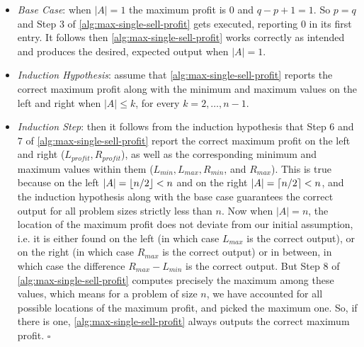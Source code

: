 \documentclass{article}
\begin{document}
\begin{enumerate}[leftmargin={*}, font={\bf}, label={\arabic*.}, ref={\arabic*}]
\begin{enumerate}
        \begin{itemize}[itemsep=0pt]
          \item
            {\it Base Case}: when $|A| = 1$ the maximum profit is $0$ and $q - p + 1 = 1$. So $p =
            q$ and Step $3$ of \autoref{alg:max-single-sell-profit} gets executed, reporting $0$ in
            its first entry. It follows then \autoref{alg:max-single-sell-profit} works correctly
            as intended and produces the desired, expected output when $|A| = 1$.

          \item
            {\it Induction Hypothesis}: assume that \autoref{alg:max-single-sell-profit} reports
            the correct maximum profit along with the minimum and maximum values on the left and
            right when $|A| \leq k$, for every $k = 2, \ldots, n-1$.

          \item
            {\it Induction Step}: then it follows from the induction hypothesis that Step $6$ and
            $7$ of \autoref{alg:max-single-sell-profit} report the correct maximum profit on the
            left and right ($L_{profit}, R_{profit}$), as well as the corresponding minimum and
            maximum values within them ($L_{min}, L_{max}, R_{min}$, and $R_{max}$). This is true
            because on the left $|A| = \lfloor n/2\rfloor < n$ and on the right $|A| = \lceil n/2\rceil < n$,
            and the induction hypothesis along with the base case guarantees the correct output
            for all problem sizes strictly less than $n$. Now when $|A| = n$, the location of the
            maximum profit does not deviate from our initial assumption, i.e. it is either found
            on the left (in which case $L_{max}$ is the correct output), or on the right (in which
            case $R_{max}$ is the correct output) or in between, in which case the difference
            $R_{max} - L_{min}$ is the correct output. But Step $8$ of
            \autoref{alg:max-single-sell-profit} computes precisely the maximum among these values,
            which means for a problem of size $n$, we have accounted for all possible locations of
            the maximum profit, and picked the maximum one. So, if there is one, 
            \autoref{alg:max-single-sell-profit} always outputs the correct maximum profit. \hfill
            $\square$
      \end{itemize}
    \end{enumerate}
\end{enumerate}
\end{document}
